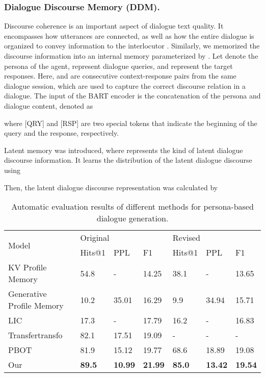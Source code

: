 \documentclass[letterpaper]{article} \usepackage{aaai23}  \usepackage{times}  \usepackage{helvet}  \usepackage{courier}  \usepackage[hyphens]{url}  \usepackage{graphicx} \urlstyle{rm} \def\UrlFont{\rm}  \usepackage{natbib}  \usepackage{caption} \frenchspacing  \setlength{\pdfpagewidth}{8.5in}  \setlength{\pdfpageheight}{11in}  \usepackage{algorithm}
\begin{document}
\subsubsection{Dialogue Discourse Memory (DDM).}
Discourse coherence is an important aspect of dialogue text quality. It encompasses how utterances are connected, as well as how the entire dialogue is organized to convey information to the interlocutor \cite{Bao2020}. Similarly, we memorized the discourse information into an internal memory  parameterized by . Let  denote the persona of the agent,  represent  dialogue queries, and  represent the target responses. Here,  and  are consecutive context-response pairs from the same dialogue session, which are used to capture the correct discourse relation in a dialogue. The input of the BART encoder is the concatenation of the persona and dialogue content, denoted as 

where \rm{[QRY]} and \rm{[RSP]} are two special tokens that indicate the beginning of the query and the response, respectively.

Latent memory  was introduced, where  represents the kind of latent dialogue discourse information. It learns the distribution of the latent dialogue discourse using


Then, the latent dialogue discourse representation was calculated by

\begin{table*}[t]
  \centering
    \begin{tabular}{lllllll}
    \toprule
    \multirow{2}[4]{*}{Model} & \multicolumn{3}{p{12.57em}}{Original} & \multicolumn{3}{p{12.57em}}{Revised} \\
\cmidrule{2-7}    \multicolumn{1}{c}{} & \multicolumn{1}{p{4.19em}}{Hits@1} & \multicolumn{1}{p{4.19em}}{PPL} & \multicolumn{1}{p{4.19em}}{F1} & \multicolumn{1}{p{4.19em}}{Hits@1} & \multicolumn{1}{p{4.19em}}{PPL} & \multicolumn{1}{p{4.19em}}{F1} \\
    \midrule
    KV Profile Memory & 54.8  &  -    & 14.25 & 38.1  &  -    & 13.65 \\
Generative Profile Memory & 10.2  & 35.01 & 16.29 & 9.9   & 34.94 & 15.71 \\
LIC   & 17.3  &   -   & 17.79 & 16.2  &   -   & 16.83 \\
Transfertransfo & 82.1  & 17.51 & 19.09 &   -   &   -   &  - \\
PBOT & 81.9  & 15.12 & 19.77 & 68.6  & 18.89 & 19.08 \\
Our   & \textbf{89.5} & \textbf{10.99} & \textbf{21.99} & \textbf{85.0} & \textbf{13.42} & \textbf{19.54} \\
    \bottomrule
    \end{tabular}
\caption{Automatic evaluation results of different methods for persona-based dialogue generation.}
\label{table1}
\end{table*}
\end{document}
